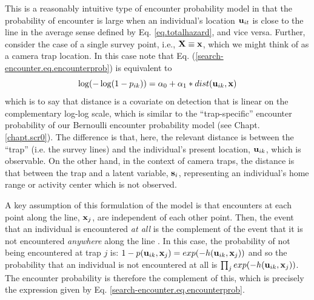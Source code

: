 This is a reasonably intuitive type of encounter probability model in
that the probability of encounter is large when an individual's
location ${\bf u}_{it}$ is close to the line in the average sense
defined by Eq. \ref{eq.totalhazard}, and vice versa.
Further, consider the case of a single survey point, i.e., ${\bf X} \equiv {\bf
  x}$, which we might think of as a camera trap location.  In this
case note that Eq. (\ref{search-encounter.eq.encounterprob}) is equivalent to
\[
\log(-\log(1-p_{ik})) = \alpha_{0} + \alpha_{1}*dist( {\bf u}_{ik},{\bf x})
\]
which is to say that distance is a covariate on detection that is
linear on the complementary log-log scale, which is similar to the
``trap-specific'' encounter probability of our Bernoulli encounter
probability model (see Chapt. \ref{chapt.scr0}).
The difference is that, here, the relevant distance
is between the ``trap'' (i.e. the survey lines) and the individual's
present location, ${\bf u}_{ik}$, which is observable. On the other
hand, in the context of camera traps, the distance is that between the
trap and a latent variable, ${\bf s}_{i}$, representing an
individual's home range or activity center which is not observed.


A key assumption of this formulation of the model is that 
encounters at each point along the line, ${\bf x}_{j}$, are
independent of each other point. Then, the event that an individual is
encountered {\it at all} is the complement of the event that it is not
encountered {\it anywhere} along the line \citep{hayes_buckland:1983}.
In this case, the probability of not being encountered at trap $j$ is:
 $1-p({\bf u}_{ik},{\bf x}_{j}) = exp(-h({\bf u}_{ik},{\bf x}_{j}))$
and so the probability that an individual is not encountered at all is
 $\prod_{j} exp(-h({\bf u}_{ik},{\bf x}_{j}))$. The encounter
probability is therefore the complement of this, which is precisely
the expression given by Eq. \ref{search-encounter.eq.encounterprob}.


